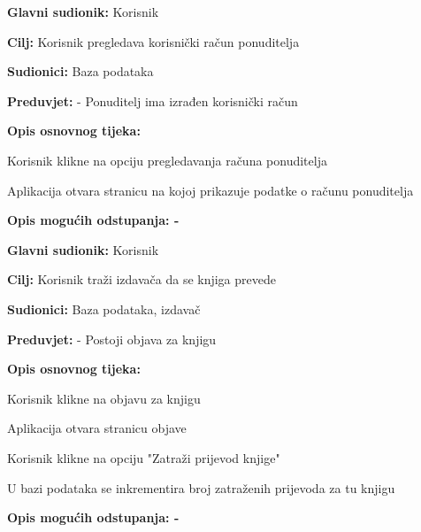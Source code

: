                     \noindent {}
					\begin{packed_item}
	
						\item \textbf{Glavni sudionik: } Korisnik
						\item  \textbf{Cilj:} Korisnik pregledava korisnički račun ponuditelja
						\item  \textbf{Sudionici:} Baza podataka
						\item  \textbf{Preduvjet:} - Ponuditelj ima izrađen korisnički račun
						\item  \textbf{Opis osnovnog tijeka:}
						
						\item[] \begin{packed_enum}
	
							\item Korisnik klikne na opciju pregledavanja računa ponuditelja
                            \item Aplikacija otvara stranicu na kojoj prikazuje podatke o računu ponuditelja
						\end{packed_enum}
						
						\item  \textbf{Opis mogućih odstupanja: -}
					\end{packed_item}

                    \noindent {}
					\begin{packed_item}
	
						\item \textbf{Glavni sudionik: } Korisnik
						\item  \textbf{Cilj:} Korisnik traži izdavača da se knjiga prevede
						\item  \textbf{Sudionici:} Baza podataka, izdavač
						\item  \textbf{Preduvjet:} - Postoji objava za knjigu
						\item  \textbf{Opis osnovnog tijeka:}
						
						\item[] \begin{packed_enum}
	
							\item Korisnik klikne na objavu za knjigu
                            \item Aplikacija otvara stranicu objave 
							\item Korisnik klikne na opciju "Zatraži prijevod knjige"
                            \item U bazi podataka se inkrementira broj zatraženih prijevoda za tu knjigu
						\end{packed_enum}
						
						\item  \textbf{Opis mogućih odstupanja: -}
					\end{packed_item}

